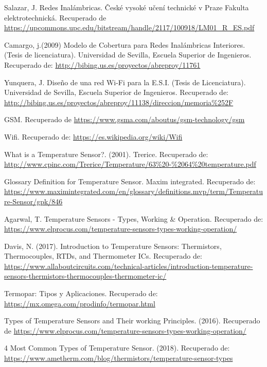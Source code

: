 \begin{thebibliography}{0}
	 Salazar, J. Redes Inalámbricas. České vysoké učení technické v Praze Fakulta elektrotechnická. Recuperado de \url{https://upcommons.upc.edu/bitstream/handle/2117/100918/LM01_R_ES.pdf}
	
	 Camargo, j.(2009) Modelo de Cobertura para Redes Inalámbricas Interiores. (Tesis de licenciatura). Universidad de Sevilla, Escuela Superior de Ingenieros. Recuperado de: \url{http://bibing.us.es/proyectos/abreproy/11761}
	
	 Yunquera, J. Diseño de una red Wi-Fi para la E.S.I. (Tesis de Licenciatura). Universidad de Sevilla, Escuela Superior de Ingenieros. Recuperado de: \url{http://bibing.us.es/proyectos/abreproy/11138/direccion/memoria%252F}
	
	 GSM. Recuperado de \url{https://www.gsma.com/aboutus/gsm-technology/gsm}
	
	 Wifi. Recuperado de: \url{https://es.wikipedia.org/wiki/Wifi}
	
	
	 What is a Temperature Sensor?. (2001). Trerice. Recuperado de: \url{http://www.cpinc.com/Trerice/Temperature/63%20-%2064%20temperature.pdf}
	
	 Glossary Definition for Temperature Sensor. Maxim integrated. Recuperado de: \url{https://www.maximintegrated.com/en/glossary/definitions.mvp/term/Temperature-Sensor/gpk/846}
	
	 Agarwal, T.  Temperature Sensors - Types, Working \& Operation. Recuperado de: \url{https://www.elprocus.com/temperature-sensors-types-working-operation/}
	
	 Davis, N. (2017). Introduction to Temperature Sensors: Thermistors, Thermocouples, RTDs, and Thermometer ICs. Recuperado de: \url{https://www.allaboutcircuits.com/technical-articles/introduction-temperature-sensors-thermistors-thermocouples-thermometer-ic/}
	
	 Termopar: Tipos y Aplicaciones. Recuperado de: \url{ https://mx.omega.com/prodinfo/termopar.html}
	
	 Types of Temperature Sensors and Their working Principles. (2016). Recuperado de \url{https://www.elprocus.com/temperature-sensors-types-working-operation/}
	
	 4 Most Common Types of Temperature Sensor. (2018). Recuperado de: \url{https://www.ametherm.com/blog/thermistors/temperature-sensor-types}
	

\end{thebibliography}
